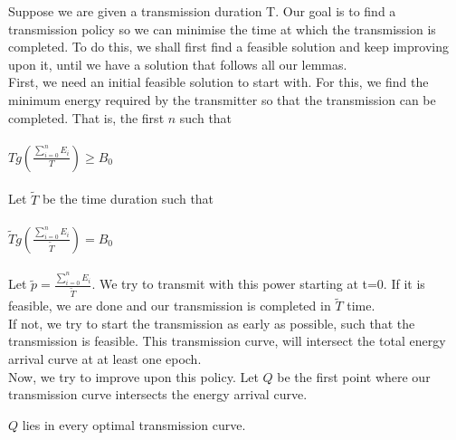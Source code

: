 Suppose we are given a transmission duration T. Our goal is to find a transmission policy so we can minimise the time at which the transmission is completed. To do this, we shall first find a feasible solution and keep improving upon it, until we have a solution that follows all our lemmas. 
\\First, we need an initial feasible solution to start with. For this, we find the minimum energy required by the transmitter so that the transmission can be completed. That is, the first $n$ such that \\\\
$Tg(\frac{\sum_{i=0}^n E_i}{T})\geq B_0$\\\\
Let $\tilde{T}$ be the time duration such that\\\\
$\tilde{T}g(\frac{\sum_{i=0}^n E_i}{\tilde{T}})=B_0$\\\\
Let $\tilde{p}=\frac{\sum_{i=0}^n E_i}{\tilde{T}}$. We try to transmit with this power starting at t=0. If it is feasible, we are done and our transmission is completed in $\tilde{T}$ time.\\
If not, we try to start the transmission as early as possible, such that the transmission is feasible. This transmission curve, will intersect the total energy arrival curve at at least one epoch.\\
Now, we try to improve upon this policy. Let $Q$ be the first point where our transmission curve intersects the energy arrival curve.\\
\begin{lemma}
$Q$ lies in every optimal transmission curve.
\end{lemma}
